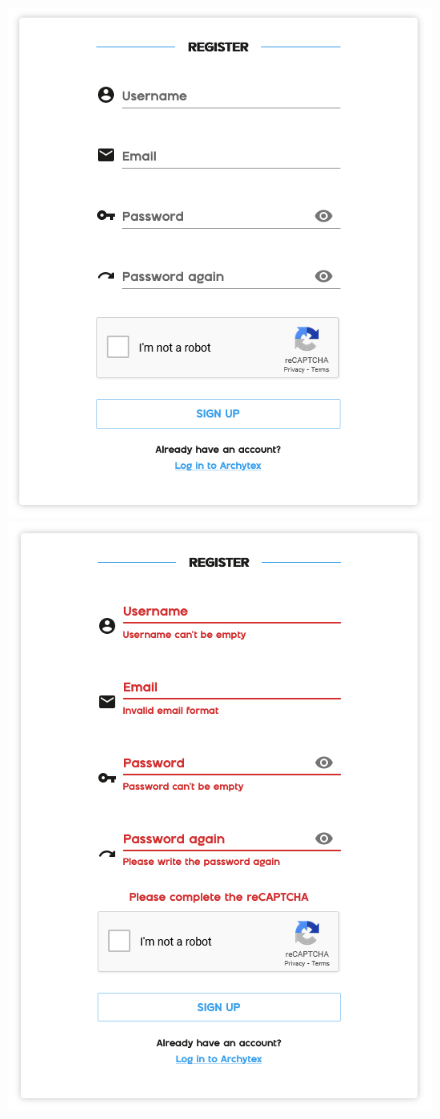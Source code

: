 \begin{figure}[H]
  \centering
  \includegraphics[scale=.5]{parts/user-documentation/account/images/register.png}
  \includegraphics[scale=.5]{parts/user-documentation/account/images/register-errors.png}

\end{figure}
